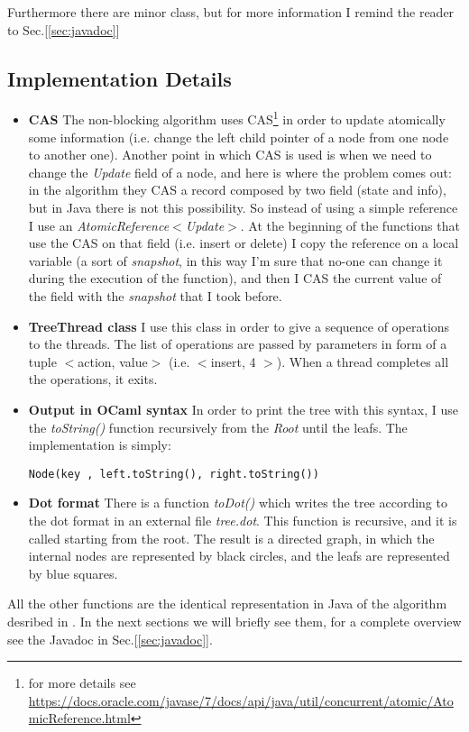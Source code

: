 \documentclass[a4paper]{article}
\begin{document}
\noindent

Furthermore there are minor class, but for more information I remind the reader to Sec.[\ref{sec:javadoc}]

\subsection{Implementation Details}
\begin{itemize}
  \item \textbf{\ac{CAS}} The non-blocking algorithm uses \ac{CAS}\footnote{for more details see \url{https://docs.oracle.com/javase/7/docs/api/java/util/concurrent/atomic/AtomicReference.html}} in order to update atomically some information (i.e. change the left child pointer of a node from one node to another one). Another point in which \ac{CAS} is used is when we need to change the \emph{Update} field of a node, and here is where the problem comes out: in the algorithm they \ac{CAS} a record composed by two field (state and info), but in Java there is not this possibility. So instead of using a simple reference I use an \emph{AtomicReference$<$Update$>$}. At the beginning of the functions that use the \ac{CAS} on that field (i.e. insert or delete) I copy the reference on a local variable (a sort of \emph{snapshot}, in this way I'm sure that no-one can change it during the execution of the function), and then I \ac{CAS} the current value of the field with the \emph{snapshot} that I took before.
  \item \textbf{TreeThread class} I use this class in order to give a sequence of operations to the threads. The list of operations are passed by parameters in form of a tuple $<$action, value$>$ (i.e. $<$insert, 4 $>$). When a thread completes all the operations, it exits.
  \item \textbf{Output in OCaml syntax} In order to print the tree with this syntax, I use the \emph{toString()} function recursively from the \emph{Root} until the leafs. The implementation is simply:

  \verb|Node(key , left.toString(), right.toString())|
  \item \textbf{Dot format} There is a function \emph{toDot()} which writes the tree according to the dot format in an external file \emph{tree.dot}. This function is recursive, and it is called starting from the root. The result is a directed graph, in which the internal nodes are represented by black circles, and the leafs are represented by blue squares.
\end{itemize}
\noindent
All the other functions are the identical representation in Java of the algorithm desribed in \cite{algorithm}. In the next sections we will briefly see them, for a complete overview see the Javadoc in Sec.[\ref{sec:javadoc}]. 
\end{document}
